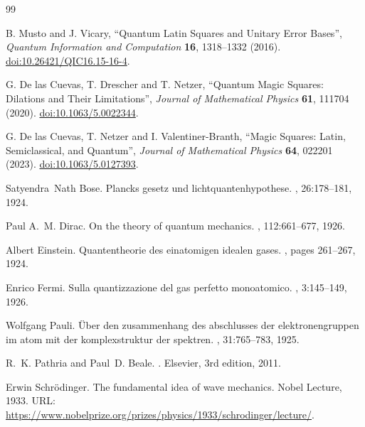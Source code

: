 \begingroup\fontsize{9.2}{10.6}\selectfont
\begin{thebibliography}{99}\fontsize{9.2}{10.6}\selectfont\setlength{\parsep}{0pt}\setlength{\itemsep}{1pt}\setlength{\parskip}{0pt}
{}
 B. Musto and J. Vicary, ``Quantum Latin Squares and Unitary Error Bases'', \emph{Quantum Information and Computation} \textbf{16}, 1318--1332 (2016). \href{https://doi.org/10.26421/QIC16.15-16-4}{doi:10.26421/QIC16.15-16-4}.

 G. De las Cuevas, T. Drescher and T. Netzer, ``Quantum Magic Squares: Dilations and Their Limitations'', \emph{Journal of Mathematical Physics} \textbf{61}, 111704 (2020). \href{https://doi.org/10.1063/5.0022344}{doi:10.1063/5.0022344}.

 G. De las Cuevas, T. Netzer and I. Valentiner-Branth, ``Magic Squares: Latin, Semiclassical, and Quantum'', \emph{Journal of Mathematical Physics} \textbf{64}, 022201 (2023). \href{https://doi.org/10.1063/5.0127393}{doi:10.1063/5.0127393}.

Satyendra~Nath Bose.
\newblock Plancks gesetz und lichtquantenhypothese.
, 26:178--181, 1924.

Paul A.~M. Dirac.
\newblock On the theory of quantum mechanics.
, 112:661--677, 1926.

Albert Einstein.
\newblock Quantentheorie des einatomigen idealen gases.
,
  pages 261--267, 1924.

Enrico Fermi.
\newblock Sulla quantizzazione del gas perfetto monoatomico.
, 3:145--149, 1926.

Wolfgang Pauli.
\newblock Über den zusammenhang des abschlusses der elektronengruppen im atom
  mit der komplexstruktur der spektren.
, 31:765--783, 1925.

R.~K. Pathria and Paul~D. Beale.
.
\newblock Elsevier, 3rd edition, 2011.

Erwin Schrödinger.
\newblock The fundamental idea of wave mechanics.
\newblock Nobel Lecture, 1933.
\newblock URL:
  \url{https://www.nobelprize.org/prizes/physics/1933/schrodinger/lecture/}.


\end{thebibliography}
